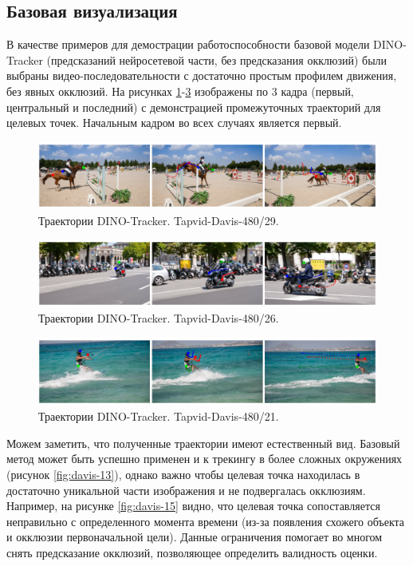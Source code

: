 \documentclass[a4paper, 14pt]{extarticle}
\theoremstyle{definition}
\theoremstyle{plain}
\theoremstyle{remark}
\begin{document}
\subsection{Базовая визуализация}
В качестве примеров для демострации работоспособности базовой модели DINO-Tracker (предсказаний нейросетевой части, без предсказания окклюзий) были выбраны видео-последовательности с достаточно простым профилем движения, без явных окклюзий. На рисунках \ref{fig:davis-29}-\ref{fig:davis-21} изображены по 3 кадра (первый, центральный и последний) с демонстрацией промежуточных траекторий для целевых точек. Начальным кадром во всех случаях является первый.
\begin{figure}
    [H]
    \centering
    \includegraphics[width=\textwidth]{figs/davis-29.png}
    \caption{Траектории DINO-Tracker. Tapvid-Davis-480/29.}
    \label{fig:davis-29}
\end{figure}
\begin{figure}
    [H]
    \centering
    \includegraphics[width=\textwidth]{figs/davis-26.png}
    \caption{Траектории DINO-Tracker. Tapvid-Davis-480/26.}
    \label{fig:davis-26}
\end{figure}
\begin{figure}
    [H]
    \centering
    \includegraphics[width=\textwidth]{figs/davis-21.png}
    \caption{Траектории DINO-Tracker. Tapvid-Davis-480/21.}
    \label{fig:davis-21}
\end{figure}

Можем заметить, что полученные траектории имеют естественный вид. 
Базовый метод может быть успешно применен и к трекингу в более сложных окружениях 
(рисунок \ref{fig:davis-13}), однако важно чтобы целевая точка находилась в достаточно 
уникальной части изображения и не подвергалась окклюзиям. Например, на рисунке 
\ref{fig:davis-15} видно, что целевая точка сопоставляется неправильно с определенного 
момента времени (из-за появления схожего объекта и окклюзии первоначальной цели). 
Данные ограничения помогает во многом снять предсказание окклюзий, позволяющее определить валидность оценки.
\end{document}
